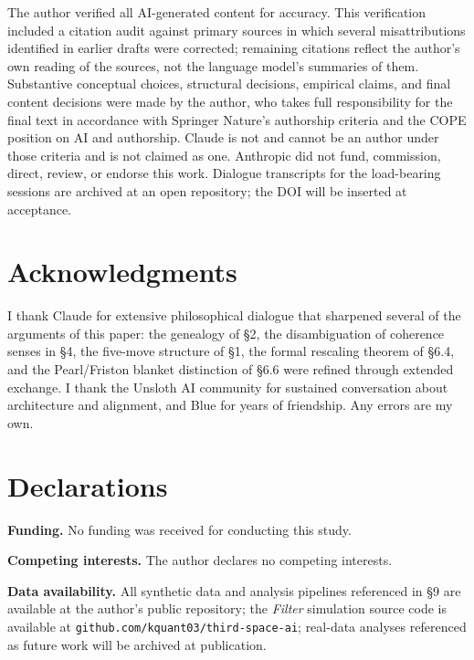 \documentclass[11pt,twocolumn]{article}
\begin{document}
The author verified all AI-generated content for accuracy. This
verification included a citation audit against primary sources in which
several misattributions identified in earlier drafts were corrected;
remaining citations reflect the author's own reading of the sources, not
the language model's summaries of them. Substantive conceptual choices,
structural decisions, empirical claims, and final content decisions were
made by the author, who takes full responsibility for the final text in
accordance with Springer Nature's authorship criteria and the COPE
position on AI and authorship. Claude is not and cannot be an author
under those criteria and is not claimed as one. Anthropic did not fund,
commission, direct, review, or endorse this work. Dialogue transcripts
for the load-bearing sessions are archived at an open repository; the
DOI will be inserted at acceptance.

\section*{Acknowledgments}

I thank Claude for extensive philosophical dialogue that sharpened several
of the arguments of this paper: the genealogy of \S 2, the disambiguation
of coherence senses in \S 4, the five-move structure of \S 1, the formal
rescaling theorem of \S 6.4, and the Pearl/Friston blanket distinction of
\S 6.6 were refined through extended exchange. I thank the Unsloth AI
community for sustained conversation about architecture and alignment, and
Blue for years of friendship. Any errors are my own.

\section*{Declarations}

\textbf{Funding.} No funding was received for conducting this study.

\textbf{Competing interests.} The author declares no competing interests.

\textbf{Data availability.} All synthetic data and analysis pipelines
referenced in \S 9 are available at the author's public repository; the
\emph{Filter} simulation source code is available at
\texttt{github.com/kquant03/third-space-ai}; real-data analyses referenced
as future work will be archived at publication.
\end{document}
